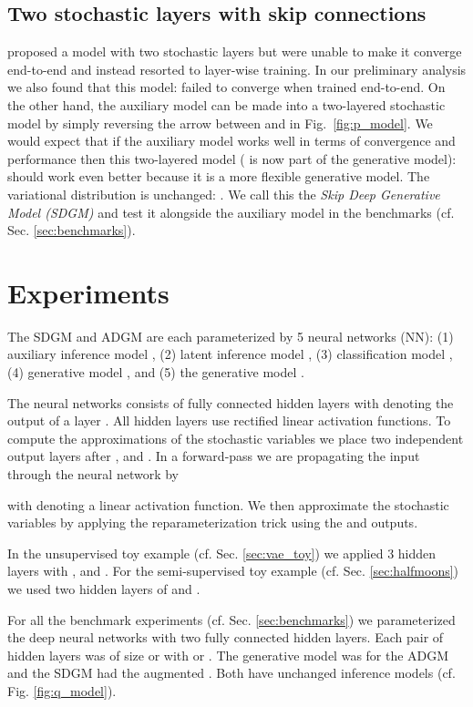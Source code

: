 \documentclass{article}
\begin{document}
\subsection{Two stochastic layers with skip connections} \label{sec:sdgm}
\citet{Kingma14} proposed a model with two stochastic layers but were unable to make it converge end-to-end and instead resorted to layer-wise training. In our preliminary analysis we also found that this model:  failed to converge when trained end-to-end. On the other hand, the auxiliary model can be made into a two-layered stochastic model by simply reversing the arrow between  and  in Fig.~\ref{fig:p_model}. We would expect that if the auxiliary model works well in terms of convergence and performance then this two-layered model ( is now part of the generative model):  should work even better because it is a more flexible generative model. The variational distribution is unchanged: . We call this the \emph{Skip Deep Generative Model (SDGM)} and test it alongside the auxiliary model in the benchmarks (cf. Sec. \ref{sec:benchmarks}).

\section{Experiments}\label{sec:experimenta_details}
The SDGM and ADGM are each parameterized by 5 neural networks (NN): (1) auxiliary inference model , (2) latent inference model , (3) classification model , (4) generative model , and (5) the generative model .

The neural networks consists of  fully connected hidden layers with  denoting the output of a layer . All hidden layers use rectified linear activation functions. To compute the approximations of the stochastic variables we place two independent output layers after ,  and . In a forward-pass we are propagating the input  through the neural network by

with  denoting a linear activation function. We then approximate the stochastic variables by applying the reparameterization trick using the  and  outputs.

In the unsupervised toy example (cf. Sec. \ref{sec:vae_toy}) we applied 3 hidden layers with ,  and . For the semi-supervised toy example (cf. Sec. \ref{sec:halfmoons}) we used two hidden layers of  and .

For all the benchmark experiments (cf. Sec. \ref{sec:benchmarks}) we parameterized the deep neural networks with  two fully connected hidden layers. Each pair of hidden layers was of size  or  with   or . The generative model was  for the ADGM and the SDGM had the augmented . Both have unchanged inference models (cf. Fig. \ref{fig:q_model}).
\end{document}
